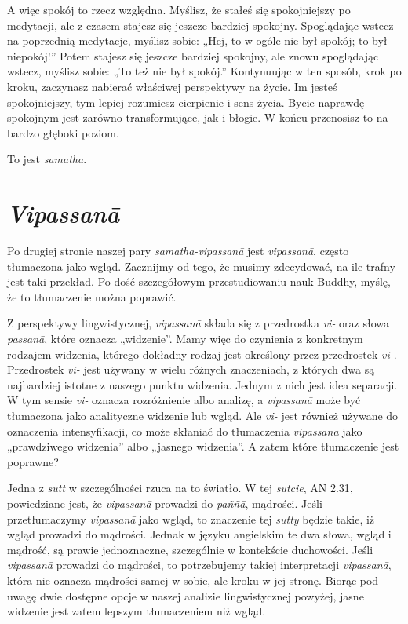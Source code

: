 \documentclass[12pt,openany]{book}
\begin{document}
A więc spokój to rzecz względna. Myślisz, że stałeś się spokojniejszy po medytacji, ale z czasem stajesz się jeszcze bardziej spokojny. Spoglądając wstecz na poprzednią medytacje, myślisz sobie: „Hej, to w ogóle nie był spokój; to był niepokój!” Potem stajesz się jeszcze bardziej spokojny, ale znowu spoglądając wstecz, myślisz sobie: „To też nie był spokój.” Kontynuując w ten sposób, krok po kroku, zaczynasz nabierać właściwej perspektywy na życie. Im jesteś spokojniejszy, tym lepiej rozumiesz cierpienie i sens życia. Bycie naprawdę spokojnym jest zarówno transformujące, jak i błogie. W końcu przenosisz to na bardzo głęboki poziom.

To jest \textit{samatha}.

\section*{\textit{Vipassanā}}

Po drugiej stronie naszej pary \textit{samatha}\textit{-vipassanā} jest \textit{vipassanā}, często tłumaczona jako wgląd. Zacznijmy od tego, że musimy zdecydować, na ile trafny jest taki przekład. Po dość szczegółowym przestudiowaniu nauk Buddhy, myślę, że to tłumaczenie można poprawić.

Z perspektywy lingwistycznej, \textit{vipassanā} składa się z przedrostka \textit{vi-} oraz słowa \textit{passanā}, które oznacza „widzenie”. Mamy więc do czynienia z konkretnym rodzajem widzenia, którego dokładny rodzaj jest określony przez przedrostek \textit{vi-}. Przedrostek \textit{vi-} jest używany w wielu różnych znaczeniach, z których dwa są najbardziej istotne z naszego punktu widzenia. Jednym z nich jest idea separacji. W tym sensie \textit{vi-} oznacza rozróżnienie albo analizę, a \textit{vipassanā} może być tłumaczona jako analityczne widzenie lub wgląd. Ale \textit{vi-} jest również używane do oznaczenia intensyfikacji, co może skłaniać do tłumaczenia \textit{vipassanā} jako „prawdziwego widzenia” albo „jasnego widzenia”. A zatem które tłumaczenie jest poprawne?

Jedna z \textit{sutt} w szczególności rzuca na to światło. W tej \textit{sutcie}, AN 2.31, powiedziane jest, że \textit{vipassanā} prowadzi do \textit{paññā}, mądrości. Jeśli przetłumaczymy \textit{vipassanā} jako wgląd, to znaczenie tej \textit{sutty} będzie takie, iż wgląd prowadzi do mądrości. Jednak w języku angielskim te dwa słowa, wgląd i mądrość, są prawie jednoznaczne, szczególnie w kontekście duchowości. Jeśli \textit{vipassanā} prowadzi do mądrości, to potrzebujemy takiej interpretacji \textit{vipassanā}, która nie oznacza mądrości samej w sobie, ale kroku w jej stronę. Biorąc pod uwagę dwie dostępne opcje w naszej analizie lingwistycznej powyżej, jasne widzenie jest zatem lepszym tłumaczeniem niż wgląd.
\end{document}
